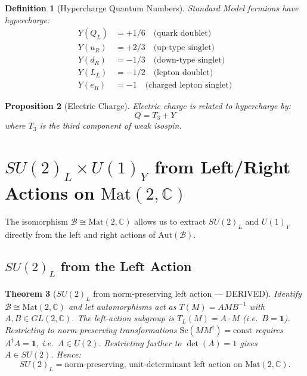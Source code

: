 \documentclass[12pt]{article}
\newtheorem{definition}{Definition}[section]
\newtheorem{theorem}[definition]{Theorem}
\newtheorem{proposition}[definition]{Proposition}
\newcommand{\C}{\mathbb{C}}
\begin{document}
\begin{definition}[Hypercharge Quantum Numbers]
Standard Model fermions have hypercharge:
\begin{align}
Y(Q_L) &= +1/6 \quad \text{(quark doublet)} \\
Y(u_R) &= +2/3 \quad \text{(up-type singlet)} \\
Y(d_R) &= -1/3 \quad \text{(down-type singlet)} \\
Y(L_L) &= -1/2 \quad \text{(lepton doublet)} \\
Y(e_R) &= -1 \quad \text{(charged lepton singlet)}
\end{align}
\end{definition}

\begin{proposition}[Electric Charge]
Electric charge is related to hypercharge by:
\begin{equation}
Q = T_3 + Y
\end{equation}
where $T_3$ is the third component of weak isospin.
\end{proposition}

\section{$SU(2)_L \times U(1)_Y$ from Left/Right Actions on $\mathrm{Mat}(2,\C)$}
\label{sec:su2_u1_from_actions}

The isomorphism $\mathcal{B} \cong \mathrm{Mat}(2,\C)$ allows us to extract
$SU(2)_L$ and $U(1)_Y$ directly from the left and right actions of
$\mathrm{Aut}(\mathcal{B})$.

\subsection{$SU(2)_L$ from the Left Action}
\label{subsec:su2l_left_action}

\begin{theorem}[$SU(2)_L$ from norm-preserving left action --- DERIVED]
\label{thm:su2l}
Identify $\mathcal{B} \cong \mathrm{Mat}(2,\C)$ and let automorphisms act as
$T(M) = A M B^{-1}$ with $A, B \in GL(2,\C)$.
The \emph{left-action subgroup} is $T_L(M) = A \cdot M$ (i.e.\ $B = \mathbf{1}$).
Restricting to norm-preserving transformations $\mathrm{Sc}(MM^\dagger) = \mathrm{const}$
requires $A^\dagger A = \mathbf{1}$, i.e.\ $A \in U(2)$.
Restricting further to $\det(A) = 1$ gives $A \in SU(2)$.
Hence:
\begin{equation}
  SU(2)_L = \text{norm-preserving, unit-determinant left action on } \mathrm{Mat}(2,\C).
  \tag{DERIVED}
\end{equation}
\end{theorem}
\end{document}
